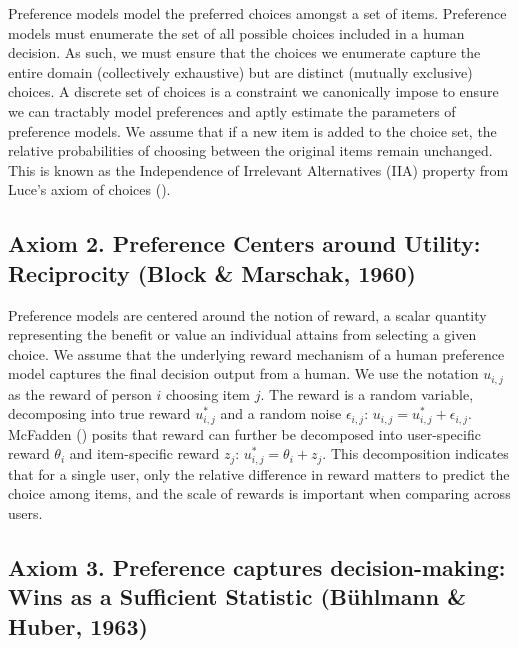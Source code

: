 \documentclass[
  letterpaper,
  numbers=noenddot,
  DIV=11]{scrreprt}
\theoremstyle{plain}
\theoremstyle{definition}
\theoremstyle{remark}
\begin{document}
Preference models model the preferred choices amongst a set of items.
Preference models must enumerate the set of all possible choices
included in a human decision. As such, we must ensure that the choices
we enumerate capture the entire domain (collectively exhaustive) but are
distinct (mutually exclusive) choices. A discrete set of choices is a
constraint we canonically impose to ensure we can tractably model
preferences and aptly estimate the parameters of preference models. We
assume that if a new item is added to the choice set, the relative
probabilities of choosing between the original items remain unchanged.
This is known as the Independence of Irrelevant Alternatives (IIA)
property from Luce's axiom of choices ().

\subsection{Axiom 2. Preference Centers around Utility: Reciprocity
(Block \& Marschak,
1960)}\label{axiom-2-preference-centers-around-reward}

Preference models are centered around the notion of reward, a scalar
quantity representing the benefit or value an individual attains from
selecting a given choice. We assume that the underlying reward mechanism
of a human preference model captures the final decision output from a
human. We use the notation \(u_{i,j}\) as the reward of person \(i\)
choosing item \(j\). The reward is a random variable, decomposing into
true reward \(u_{i,j}^*\) and a random noise \(\epsilon_{i,j}\):
\(u_{i,j} = u_{i,j}^* + \epsilon_{i,j}\). McFadden
() posits that reward can
further be decomposed into user-specific reward \(\theta_i\) and
item-specific reward \(z_j\): \(u_{i,j}^* = \theta_i + z_j\). This
decomposition indicates that for a single user, only the relative
difference in reward matters to predict the choice among items, and the
scale of rewards is important when comparing across users.

\subsection{Axiom 3. Preference captures decision-making: Wins as a
Sufficient Statistic (Bühlmann \& Huber,
1963)}\label{axiom-3-preference-captures-decision-making}
\end{document}
